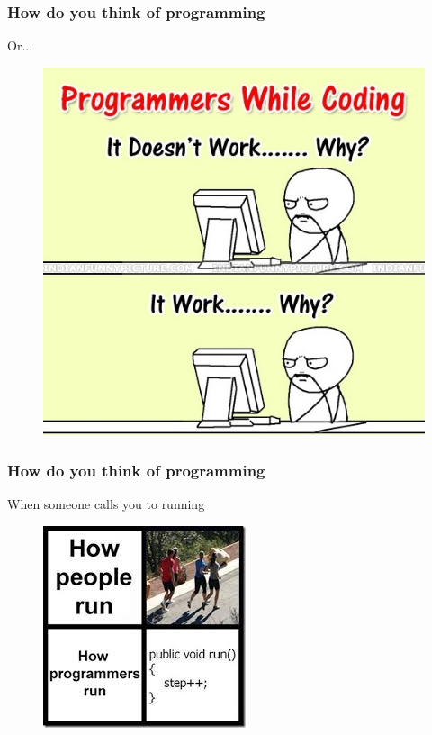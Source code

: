 \documentclass{beamer}
\begin{document}
\begin{frame}
  \frametitle{How do you think of programming}
  \begin{center}
    \huge{Or...}
    \begin{figure}
      \includegraphics[scale=.35]{./img/pain2.jpg}
    \end{figure}
  \end{center}
\end{frame}

\begin{frame}
  \frametitle{How do you think of programming}
  \huge{When someone calls you to running}
  \begin{center}
    \begin{figure}
      \includegraphics[scale=.35]{./img/joke1.jpeg}
    \end{figure}
  \end{center}
  
\end{frame}
\end{document}
